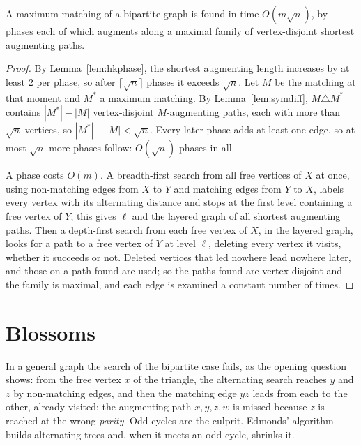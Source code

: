 \begin{theorem}\label{thm:hopcroftkarp}
A maximum matching of a bipartite graph is found in time $O(m\sqrt n)$, by phases each of which augments along a maximal family of vertex-disjoint shortest augmenting paths.
\end{theorem}
\begin{proof}
By Lemma~\ref{lem:hkphase}, the shortest augmenting length increases by at least $2$ per phase, so after $\lceil\sqrt n\rceil$ phases it exceeds $\sqrt n$. Let $M$ be the matching at that moment and $M^*$ a maximum matching. By Lemma~\ref{lem:symdiff},
$M\triangle M^*$ contains $|M^*|-|M|$ vertex-disjoint $M$-augmenting paths, each with more than $\sqrt n$ vertices, so $|M^*|-|M|<\sqrt n$. Every later phase adds at least one edge, so at most $\sqrt n$ more phases follow: $O(\sqrt n)$ phases in all.

A phase costs $O(m)$. A breadth-first search from all free vertices of $X$ at once, using non-matching edges from $X$ to $Y$ and matching edges from $Y$ to $X$, labels every vertex with its alternating distance and stops at the first level containing a free vertex of $Y$;
this gives $\ell$ and the layered graph of all shortest augmenting paths. Then a depth-first search from each free vertex of $X$, in the layered graph, looks for a path to a free vertex of $Y$ at level $\ell$, deleting every vertex it visits, whether it succeeds or not.
Deleted vertices that led nowhere lead nowhere later, and those on a path found are used; so the paths found are vertex-disjoint and the family is maximal, and each edge is examined a constant number of times.
\end{proof}

\section{Blossoms}\label{sec:blossom}

In a general graph the search of the bipartite case fails, as the opening question shows: from the free vertex $x$ of the triangle, the alternating search reaches $y$ and $z$ by non-matching edges, and then the matching edge $yz$ leads from each
to the other, already visited; the augmenting path $x,y,z,w$ is missed because $z$ is reached at the wrong \emph{parity}. Odd cycles are the culprit. Edmonds' algorithm builds alternating trees and, when it meets an odd cycle, shrinks it.


